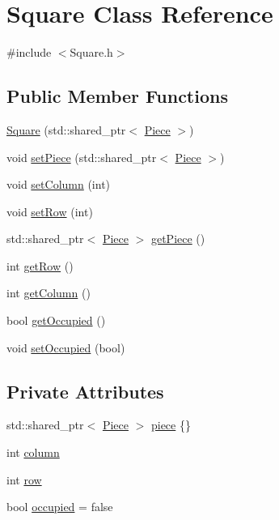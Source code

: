 \hypertarget{class_square}{}\section{Square Class Reference}
\label{class_square}


{\ttfamily \#include $<$Square.\+h$>$}

\subsection*{Public Member Functions}
\begin{DoxyCompactItemize}
\item 
\hyperlink{class_square_abddcf314d0cf5edc08cadc7a73c8e590}{Square} (std\+::shared\+\_\+ptr$<$ \hyperlink{class_piece}{Piece} $>$)
\item 
void \hyperlink{class_square_a2daa860568eaf04bb8bdde747e0c929e}{set\+Piece} (std\+::shared\+\_\+ptr$<$ \hyperlink{class_piece}{Piece} $>$)
\item 
void \hyperlink{class_square_a759f5441bdd5499b33658c00c2179556}{set\+Column} (int)
\item 
void \hyperlink{class_square_a7efdf354c2f71ae95520162743efe170}{set\+Row} (int)
\item 
std\+::shared\+\_\+ptr$<$ \hyperlink{class_piece}{Piece} $>$ \hyperlink{class_square_add0bae19dd068f4ac9a5a3c54e0e088e}{get\+Piece} ()
\item 
int \hyperlink{class_square_ad3391313a44cdbfbe87fd3ddc545feac}{get\+Row} ()
\item 
int \hyperlink{class_square_a03943abf111f746327da0682babe8375}{get\+Column} ()
\item 
bool \hyperlink{class_square_a302ea5a61721ec621c5eac19766ff45f}{get\+Occupied} ()
\item 
void \hyperlink{class_square_a0a86c9e5d8d00ad8d33f4a8f11c0186d}{set\+Occupied} (bool)
\end{DoxyCompactItemize}
\subsection*{Private Attributes}
\begin{DoxyCompactItemize}
\item 
std\+::shared\+\_\+ptr$<$ \hyperlink{class_piece}{Piece} $>$ \hyperlink{class_square_aa3ea4ebade8191d5d1a1b23855b4e434}{piece} \{\}
\item 
int \hyperlink{class_square_a572fbccc549f148942d85208ce80605f}{column}
\item 
int \hyperlink{class_square_aa353950a9ef437401db55ae605b0f8b9}{row}
\item 
bool \hyperlink{class_square_ae6af3692dc17a771c296aacf2b40a99e}{occupied} = false
\end{DoxyCompactItemize}



